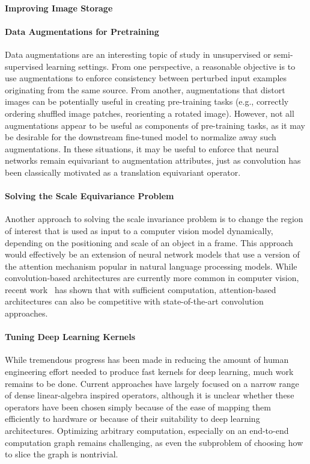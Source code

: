 \paragraph{Improving Image Storage}


\paragraph{Data Augmentations for Pretraining}
Data augmentations are an interesting topic of study in unsupervised or semi-supervised learning settings.
From one perspective, a reasonable objective is to use augmentations to enforce consistency between perturbed input examples originating from the same source.
From another, augmentations that distort images can be potentially useful in creating pre-training tasks (e.g., correctly ordering shuffled image patches, reorienting a rotated image).
However, not all augmentations appear to be useful as components of pre-training tasks, as it may be desirable for the downstream fine-tuned model to normalize away such augmentations.
In these situations, it may be useful to enforce that neural networks remain equivariant to augmentation attributes, just as convolution has been classically motivated as a translation equivariant operator.


\paragraph{Solving the Scale Equivariance Problem}
Another approach to solving the scale invariance problem is to change the region of interest that is used as input to a computer vision model dynamically, depending on the positioning and scale of an object in a frame.
This approach would effectively be an extension of neural network models that use a version of the attention mechanism popular in natural language processing models.
While convolution-based architectures are currently more common in computer vision, recent work~\cite{dosovitskiy2020image} has shown that with sufficient computation, attention-based architectures can also be competitive with state-of-the-art convolution approaches.


\paragraph{Tuning Deep Learning Kernels}
While tremendous progress has been made in reducing the amount of human engineering effort needed to produce fast kernels for deep learning, much work remains to be done.
Current approaches have largely focused on a narrow range of dense linear-algebra inspired operators, although it is unclear whether these operators have been chosen simply because of the ease of mapping them efficiently to hardware or because of their suitability to deep learning architectures.
Optimizing arbitrary computation, especially on an end-to-end computation graph remains challenging, as even the subproblem of choosing how to slice the graph is nontrivial.

